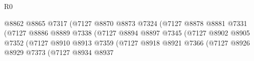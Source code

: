 \begin{lexlean}{R0}
\begin{coremodule}
                                                      @8862
                                                      @8865
                                                      @7317
                                                      (@7127
                                                        @8870
                                                        @8873
                                                        @7324
                                                        (@7127
                                                          @8878
                                                          @8881
                                                          @7331
                                                          (@7127
                                                            @8886
                                                            @8889
                                                            @7338
                                                            (@7127
                                                              @8894
                                                              @8897
                                                              @7345
                                                              (@7127
                                                                @8902
                                                                @8905
                                                                @7352
                                                                (@7127
                                                                  @8910
                                                                  @8913
                                                                  @7359
                                                                  (@7127
                                                                    @8918
                                                                    @8921
                                                                    @7366
                                                                    (@7127
                                                                      @8926
                                                                      @8929
                                                                      @7373
                                                                      (@7127
                                                                        @8934
                                                                        @8937

\end{coremodule}
\end{lexlean}
